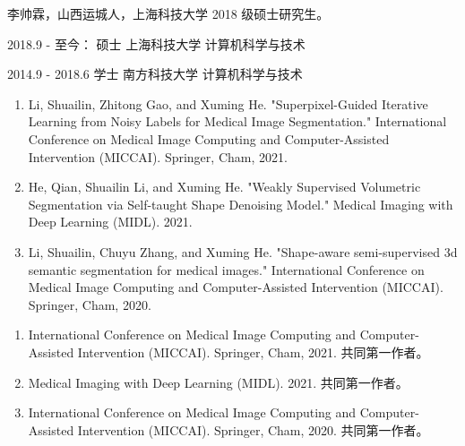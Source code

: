 \ifgraduate
\begin{resume}
李帅霖，山西运城人，上海科技大学 2018 级硕士研究生。
\end{resume}

\begin{education}
2018.9 - 至今：      \quad 硕士 \quad 上海科技大学 \quad 计算机科学与技术

2014.9 - 2018.6     \quad 学士 \quad 南方科技大学 \quad 计算机科学与技术
\end{education}

\begin{publications}
\begin{enumerate}
    \item Li, Shuailin, Zhitong Gao, and Xuming He. "Superpixel-Guided Iterative Learning from Noisy Labels for Medical Image Segmentation." International Conference on Medical Image Computing and Computer-Assisted Intervention (MICCAI). Springer, Cham, 2021.
    \item He, Qian, Shuailin Li, and Xuming He. "Weakly Supervised Volumetric Segmentation via Self-taught Shape Denoising Model." Medical Imaging with Deep Learning (MIDL). 2021.
    \item Li, Shuailin, Chuyu Zhang, and Xuming He. "Shape-aware semi-supervised 3d semantic segmentation for medical images." International Conference on Medical Image Computing and Computer-Assisted Intervention (MICCAI). Springer, Cham, 2020.
\end{enumerate}

\end{publications}

\begin{publications*}
\begin{enumerate}
    \item International Conference on Medical Image Computing and Computer-Assisted Intervention (MICCAI). Springer, Cham, 2021. 共同第一作者。
    \item Medical Imaging with Deep Learning (MIDL). 2021. 共同第一作者。
    \item International Conference on Medical Image Computing and Computer-Assisted Intervention (MICCAI). Springer, Cham, 2020. 共同第一作者。
\end{enumerate}
\end{publications*}


